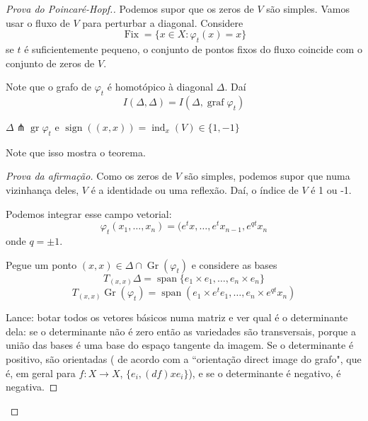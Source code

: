 \begin{proof}[Prova do Poincaré-Hopf.]\leavevmode
Podemos supor que os zeros de \(V\) são simples. Vamos usar o fluxo de \(V\) para perturbar a diagonal. Considere
\[\operatorname{F ix}=\{x \in X: \varphi_t(x)=x\}\]
se \(t\) é suficientemente pequeno, o conjunto de pontos fixos do fluxo coincide com o conjunto de zeros de \(V\).

Note que o grafo de \(\varphi_t\) é homotópico à diagonal \(\Delta\). Daí
\[I(\Delta,\Delta)=I(\Delta,\operatorname{graf}\varphi_t)\]
\begin{claim}\leavevmode
\(\Delta \pitchfork \operatorname{gr}\varphi_t\) e \(\operatorname{sign}((x,x))=\operatorname{ind}_x(V) \in \{1, -1\}\)
\end{claim}
Note que isso mostra o teorema.

\begin{proof}[Prova da afirmação]\leavevmode
	Como os zeros de \(V\) são simples, podemos supor que numa vizinhança deles, \(V\) é a identidade ou uma reflexão. Daí, o índice de \(V\) é 1 ou -1.

	Podemos integrar esse campo vetorial:
	\[\varphi_t(x_1,\ldots,x_n)=(e^tx,\ldots,e^tx_{n-1},e^{qt}x_n\]
	onde \(q=\pm 1\).

	Pegue um ponto \((x,x) \in \Delta \cap \operatorname{Gr}(\varphi_t)\) e considere as bases
	\[T_{(x,x)}\Delta=\operatorname{span}\{e_1 \times e_1,\ldots,e_n \times e_n\}\]
	\[T_{(x,x)}\operatorname{Gr}(\varphi_t)=\operatorname{span}(e_1 \times e^t e_1,\ldots,e_n \times e^{qt}x_n)\]

	{\color{2}Lance:} botar todos os vetores básicos numa matriz e ver qual é o determinante dela: se o determinante não é zero então as variedades são transversais, porque a união das bases é uma base do espaço tangente da imagem. Se o determinante é positivo, são orientadas ( de acordo com a ``orientação direct image do grafo", que é, em geral para \(f:X \to X\), \(\{e_i,(df)xe_i\}\)), e se o determinante é negativo, é negativa.


\end{proof}
\end{proof}
